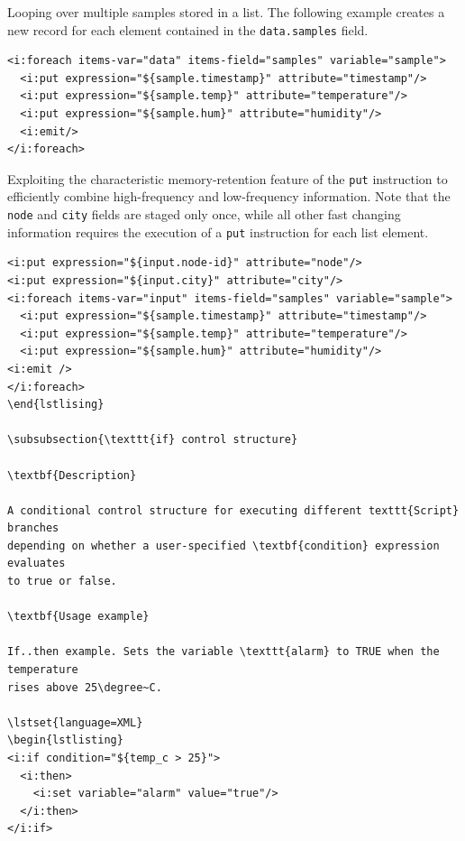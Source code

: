 Looping over multiple samples stored in a list. The following example creates a
new record for each element contained in the \texttt{data.samples} field. 

\lstset{language=XML}
\begin{lstlisting}
<i:foreach items-var="data" items-field="samples" variable="sample">
  <i:put expression="${sample.timestamp}" attribute="timestamp"/>
  <i:put expression="${sample.temp}" attribute="temperature"/>
  <i:put expression="${sample.hum}" attribute="humidity"/>
  <i:emit/>
</i:foreach>
\end{lstlisting}

Exploiting the characteristic memory-retention feature of the \texttt{put}
instruction to efficiently combine high-frequency and low-frequency
information. Note that the \texttt{node} and \texttt{city} fields are staged
only once, while all other fast changing information requires the execution of
a \texttt{put} instruction for each list element.

\lstset{language=XML}
\begin{lstlisting}
<i:put expression="${input.node-id}" attribute="node"/>
<i:put expression="${input.city}" attribute="city"/>
<i:foreach items-var="input" items-field="samples" variable="sample">
  <i:put expression="${sample.timestamp}" attribute="timestamp"/>
  <i:put expression="${sample.temp}" attribute="temperature"/>
  <i:put expression="${sample.hum}" attribute="humidity"/>
<i:emit />
</i:foreach> 
\end{lstlising}

\subsubsection{\texttt{if} control structure}

\textbf{Description}

A conditional control structure for executing different texttt{Script} branches
depending on whether a user-specified \textbf{condition} expression evaluates
to true or false.

\textbf{Usage example}

If..then example. Sets the variable \texttt{alarm} to TRUE when the temperature
rises above 25\degree~C.

\lstset{language=XML}
\begin{lstlisting}
<i:if condition="${temp_c > 25}"> 
  <i:then>
    <i:set variable="alarm" value="true"/>
  </i:then>
</i:if>
\end{lstlisting}

